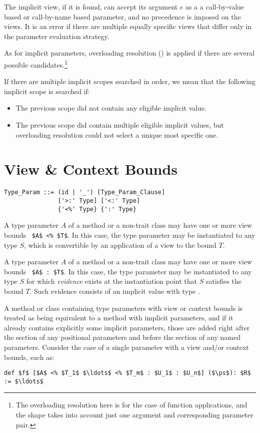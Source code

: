The implicit view, if it is found, can accept its argument $e$ as a a call-by-value based or call-by-name based parameter, and no precedence is imposed on the views. It is an error if there are multiple equally specific views that differ only in the parameter evaluation strategy. 

As for implicit parameters, overloading resolution () is applied if there are several possible candidates.\footnote{The overloading resolution here is for the case of function applications, and the shape takes into account just one argument and corresponding parameter pair.}

If there are multiple implicit scopes searched in order, we mean that the following implicit scope is searched if:
\begin{itemize}
  \item The previous scope did not contain any eligible implicit value.
  \item The previous scope did contain multiple eligible implicit values, but overloading resolution could not select a unique most specific one. 
\end{itemize}





\section{View \& Context Bounds}
\label{sec:view-bounds}
\label{sec:context-bounds}

\grammar\begin{lstlisting}
Type_Param ::= (id | '_') [Type_Param_Clause]
               ['>:' Type] ['<:' Type]
               {'<%' Type} {':' Type}
\end{lstlisting}

A type parameter $A$ of a method or a non-trait class may have one or more view bounds ~\lstinline!$A$ <% $T$!. In this case, the type parameter may be instantiated to any type $S$, which is convertible by an application of a view to the bound $T$.

A type parameter $A$ of a method or a non-trait class may have one or more view bounds ~\lstinline!$A$ : $T$!. In this case, the type parameter may be instantiated to any type $S$ for which {\em evidence} exists at the instantiation point that $S$ satisfies the bound $T$. Such evidence consists of an implicit value with type . 

A method or class containing type parameters with view or context bounds is treated as being equivalent to a method with implicit parameters, and if it already contains explicitly some implicit parameters, those are added right after the section of any positional parameters and before the section of any named parameters. Consider the case of a single parameter with a view and/or context bounds, such as: 
\begin{lstlisting}
def $f$ [$A$ <% $T_1$ $\ldots$ <% $T_m$ : $U_1$ : $U_n$] ($\ps$): $R$ := $\ldots$
\end{lstlisting}

